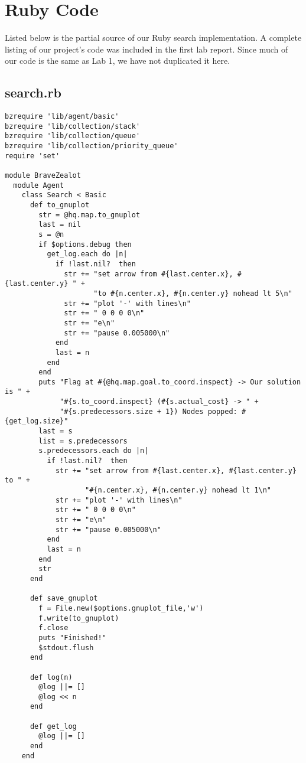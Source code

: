 \chapter{Ruby Code}\label{app:code}
Listed below is the partial source of our Ruby search implementation. A complete listing of our project's code was included in the first lab report.  Since much of our code is the same as Lab 1, we have not duplicated it here.
\par

\section{search.rb}
\begin{verbatim}
bzrequire 'lib/agent/basic'
bzrequire 'lib/collection/stack'
bzrequire 'lib/collection/queue'
bzrequire 'lib/collection/priority_queue'
require 'set'

module BraveZealot
  module Agent
    class Search < Basic
      def to_gnuplot
        str = @hq.map.to_gnuplot
        last = nil
        s = @n
        if $options.debug then
          get_log.each do |n|
            if !last.nil?  then
              str += "set arrow from #{last.center.x}, #{last.center.y} " +
                     "to #{n.center.x}, #{n.center.y} nohead lt 5\n"
              str += "plot '-' with lines\n"
              str += " 0 0 0 0\n"
              str += "e\n"
              str += "pause 0.005000\n"
            end
            last = n
          end
        end
        puts "Flag at #{@hq.map.goal.to_coord.inspect} -> Our solution is " +
             "#{s.to_coord.inspect} (#{s.actual_cost} -> " +
             "#{s.predecessors.size + 1}) Nodes popped: #{get_log.size}"
        last = s
        list = s.predecessors
        s.predecessors.each do |n|
          if !last.nil?  then
            str += "set arrow from #{last.center.x}, #{last.center.y} to " +
                   "#{n.center.x}, #{n.center.y} nohead lt 1\n"
            str += "plot '-' with lines\n"
            str += " 0 0 0 0\n"
            str += "e\n"
            str += "pause 0.005000\n"
          end
          last = n
        end
        str
      end

      def save_gnuplot
        f = File.new($options.gnuplot_file,'w')
        f.write(to_gnuplot)
        f.close
        puts "Finished!"
        $stdout.flush
      end

      def log(n)
        @log ||= []
        @log << n
      end

      def get_log
        @log ||= []
      end
    end


\end{verbatim}
